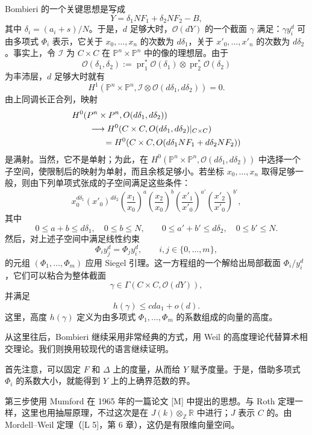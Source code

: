 Bombieri 的一个关键思想是写成
\[
Y=\delta_1NF_1+\delta_2NF_2-B,
\]
其中 $\delta_i=(a_i+s)/N$。于是，$d$ 足够大时，$\mathcal O(dY)$ 的一个截面 $\gamma$ 满足：$\gamma y_i^d$ 可由多项式 $\Phi_i$ 表示，它关于 $x_0,\ldots,x_n$ 的次数为 $d\delta_1$，关于 $x'_0,\ldots,x'_n$ 的次数为 $d\delta_2$。事实上，令 $\mathscr I$ 为 $C\times C$ 在 $\mathbb P^n\times\mathbb P^n$ 中的像的理想层。由于
\[
\mathcal O(\delta_1,\delta_2)
:=\operatorname{pr}_1^*\mathcal O(\delta_1)\otimes\operatorname{pr}_2^*\mathcal O(\delta_2)
\]
为丰沛层，$d$ 足够大时就有
\[
H^1(\mathbb P^n\times\mathbb P^n,
\mathscr I\otimes\mathcal O(d\delta_1,d\delta_2))=0.
\]
由上同调长正合列，映射
\begin{align*}
&H^0(\mathbb P^n\times\mathbb P^n,\mathcal O(d\delta_1,d\delta_2))\\
&\qquad\longrightarrow
H^0(C\times C,\mathcal O(d\delta_1,d\delta_2)|_{C\times C})\\
&\qquad\hspace{1.7em}=
H^0(C\times C,\mathcal O(d\delta_1NF_1+d\delta_2NF_2))
\end{align*}
是满射。当然，它不是单射；为此，在 $H^0(\mathbb P^n\times\mathbb P^n,\mathcal O(d\delta_1,d\delta_2))$ 中选择一个子空间，使限制后的映射为单射，而且余核足够小。若坐标 $x_0,\ldots,x_n$ 取得足够一般，则由下列单项式张成的子空间满足这些条件：
\[
x_0^{d\delta_1}(x'_0)^{d\delta_2}
\left(\frac{x_1}{x_0}\right)^a
\left(\frac{x_2}{x_0}\right)^b
\left(\frac{x'_1}{x'_0}\right)^{a'}
\left(\frac{x'_2}{x'_0}\right)^{b'},
\]
其中
\[
0\le a+b\le d\delta_1,\quad0\le b\le N,\qquad
0\le a'+b'\le d\delta_2,\quad0\le b'\le N.
\]
然后，对上述子空间中满足线性约束
\[
\Phi_i y_j^d=\Phi_j y_i^d,\qquad i,j\in\{0,\ldots,m\},
\]
的元组 $(\Phi_1,\ldots,\Phi_m)$ 应用 Siegel 引理。这一方程组的一个解给出局部截面 $\Phi_i/y_i^d$，它们可以粘合为整体截面
\[
\gamma\in\Gamma(C\times C,\mathcal O(dY)),
\]
并满足
\begin{equation*}
h(\gamma)\le cda_1+o(d).\tag{7.1}
\end{equation*}
这里，高度 $h(\gamma)$ 定义为由多项式 $\Phi_1,\ldots,\Phi_m$ 的系数组成的向量的高度。

从这里往后，Bombieri 继续采用非常经典的方式，用 Weil 的高度理论代替算术相交理论。我们则换用较现代的语言继续证明。

首先注意，可以固定 $F$ 和 $\Delta$ 上的度量，从而给 $Y$ 赋予度量。于是，借助多项式 $\Phi_i$ 的系数大小，就能得到 $Y$ 上的上确界范数的界。

第三步使用 Mumford 在 1965 年的一篇论文 [M] 中提出的思想。与 Roth 定理一样，这里也用抽屉原理，不过这次是在 $J(k)\otimes_{\mathbb Z}\mathbb R$ 中进行；$J$ 表示 $C$ 的。由 Mordell--Weil 定理（[L 5]，第 6 章），这仍是有限维向量空间。

